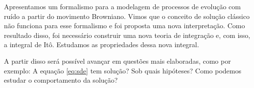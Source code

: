 \documentclass[portrait]{a0poster}	%
\theoremstyle{definition}
\begin{document}
\begin{multicols}{2}
    Apresentamos um formalismo para a modelagem de processos de evolução com ruído a partir do movimento Browniano. Vimos que o conceito de solução clássico não funciona para esse formalismo e foi proposta uma nova interpretação. Como resultado disso, foi necessário construir uma nova teoria de integração e, com isso, a integral de Itô. Estudamos as propriedades dessa nova integral. 

    A partir disso será possível avançar em questões mais elaboradas, como por exemplo: A equação \eqref{eq:sde} tem solução? Sob quais hipóteses? Como podemos estudar o comportamento da solução?
    
    \nocite{*}
    
    
    
\end{multicols}
\end{document}
